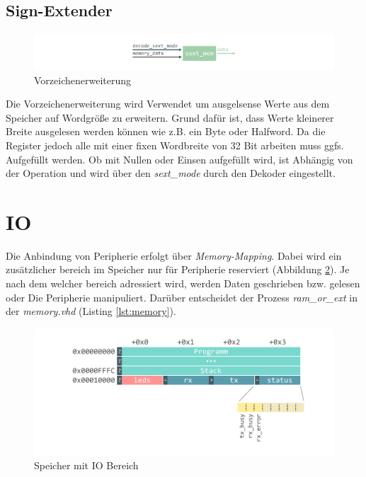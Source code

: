             


        \subsection{Sign-Extender}

            \begin{figure}[H]
                \centering
                \includegraphics[scale=1]{img/block_sext.pdf}
                \caption{Vorzeichenerweiterung}
                \label{fig:sext}
            \end{figure}

            Die Vorzeichenerweiterung wird Verwendet um ausgelsense Werte aus dem Speicher auf Wordgröße
            zu erweitern. Grund dafür ist, dass Werte kleinerer Breite ausgelesen werden können wie z.B. ein
            Byte oder Halfword. Da die Register jedoch alle mit einer fixen Wordbreite von 32 Bit arbeiten muss ggfs.
            Aufgefüllt werden. Ob mit Nullen oder Einsen aufgefüllt wird, ist Abhängig von der Operation und wird über den
            \textit{sext\_mode} durch den Dekoder eingestellt.
            
    \section{IO}

        Die Anbindung von Peripherie erfolgt über \textit{Memory-Mapping}.
        Dabei wird ein zusätzlicher bereich im Speicher nur für Peripherie reserviert (Abbildung \ref{fig:io}).
        Je nach dem welcher bereich adressiert wird, werden Daten geschrieben bzw. gelesen
        oder Die Peripherie manipuliert. Darüber entscheidet der Prozess \textit{ram\_or\_ext}
        in der \textit{memory.vhd} (Listing \ref{lst:memory}).

        \begin{figure}[H]
            \centering
            \includegraphics[scale=1]{img/memory.pdf}
            \caption{Speicher mit IO Bereich}
            \label{fig:io}
        \end{figure}


